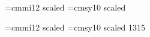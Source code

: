 \begin{\parsearg\beginxxx}
\setfont\secrm{}
\setfont\secit{}
\setfont\secsl{}
\setfont\sectt{}
\setfont\secttsl{}
\setfont\secsf{}
\let\secbf\secrm
\setfont\secsc{}
\font\seci=cmmi12 scaled 
\font\secsy=cmsy10 scaled 

\setfont\ssecrm{}
\setfont\ssecit{}
\setfont\ssecsl{}
\setfont\ssectt{}
\setfont\ssecttsl{}
\setfont\ssecsf{}
\let\ssecbf\ssecrm
\setfont\ssecsc{}
\font\sseci=cmmi12 scaled \magstephalf
\font\ssecsy=cmsy10 scaled 1315

%
\def\resetmathfonts{%
  \textfont0=\tenrm \textfont1=\teni \textfont2=\tensy
  \textfont\itfam=\tenit \textfont\slfam=\tensl \textfont\bffam=\tenbf
  \textfont\ttfam=\tentt \textfont\sffam=\tensf
}


\end{\parsearg\beginxxx}
